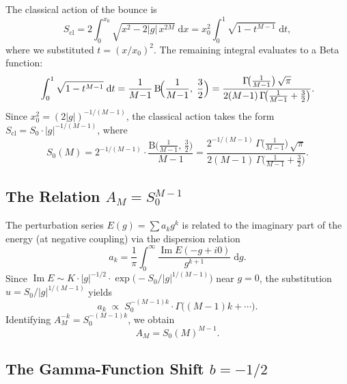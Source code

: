 \documentclass[12pt,a4paper]{article}
\numberwithin{equation}{section}
\theoremstyle{plain}
\theoremstyle{definition}
\theoremstyle{remark}
\newcommand{\dd}{\mathrm{d}}
\newcommand{\BetaF}{\mathrm{B}}
\begin{document}
The classical action of the bounce is
\begin{equation}\label{eq:Scl}
  S_{\mathrm{cl}} = 2 \int_0^{x_0} \sqrt{x^2 - 2|g|\,x^{2M}} \;\dd x
  = x_0^2 \int_0^1 \sqrt{1 - t^{M-1}} \;\dd t,
\end{equation}
where we substituted $t = (x/x_0)^2$. The remaining integral evaluates to a
Beta function:
\begin{equation}\label{eq:beta-integral}
  \int_0^1 \sqrt{1 - t^{M-1}} \;\dd t
  = \frac{1}{M{-}1}\,\BetaF\!\Bigl(\frac{1}{M{-}1},\;\frac{3}{2}\Bigr)
  = \frac{\Gamma\!\bigl(\frac{1}{M-1}\bigr)\,\sqrt{\pi}}
    {2(M{-}1)\,\Gamma\!\bigl(\frac{1}{M-1} + \frac{3}{2}\bigr)}.
\end{equation}
Since $x_0^2 = (2|g|)^{-1/(M-1)}$, the classical action takes the form
$S_{\mathrm{cl}} = S_0 \cdot |g|^{-1/(M-1)}$, where
\begin{equation}\label{eq:S0}
  \boxed{S_0(M) = 2^{-1/(M-1)} \cdot
  \frac{\BetaF\!\bigl(\frac{1}{M-1},\,\frac{3}{2}\bigr)}{M-1}
  = \frac{2^{-1/(M-1)}\,\Gamma\!\bigl(\frac{1}{M-1}\bigr)\,\sqrt{\pi}}
    {2(M{-}1)\,\Gamma\!\bigl(\frac{1}{M-1} + \frac{3}{2}\bigr)}.}
\end{equation}

\subsection{The Relation $A_M = S_0^{M-1}$}
\label{sec:AM-derivation}

The perturbation series $E(g) = \sum a_k g^k$ is related to the
imaginary part of the energy (at negative coupling) via the
dispersion relation
\begin{equation}\label{eq:dispersion}
  a_k = \frac{1}{\pi} \int_0^\infty \frac{\operatorname{Im} E(-g + i0)}{g^{k+1}} \;\dd g.
\end{equation}
Since $\operatorname{Im} E \sim K \cdot |g|^{-1/2} \cdot
\exp\bigl(-S_0/|g|^{1/(M-1)}\bigr)$ near $g = 0$,
the substitution $u = S_0 / |g|^{1/(M-1)}$ yields
\begin{equation}\label{eq:AM-derivation}
  a_k \;\propto\; S_0^{-(M-1)k} \cdot \Gamma\!\bigl((M{-}1)k + \cdots\bigr).
\end{equation}
Identifying $A_M^{-k} = S_0^{-(M-1)k}$, we obtain
\begin{equation}\label{eq:AM}
  \boxed{A_M = S_0(M)^{M-1}.}
\end{equation}

\subsection{The Gamma-Function Shift $b = -1/2$}
\label{sec:b-derivation}
\end{document}
